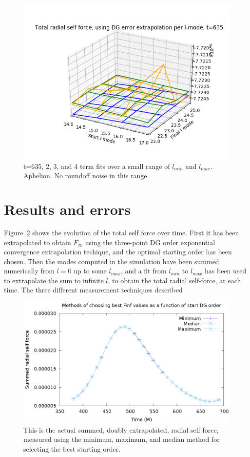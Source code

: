 \begin{figure}
  \includegraphics{bestfinflminlmax234termst635smallrange_perihelion}
  \caption{t=635, 2, 3, and 4 term fits over a small range of $l_{min}$ and $l_{max}$. Aphelion. No roundoff noise in this range.}
  \label{surface234small}
\end{figure}



\section{Results and errors}

Figure~\ref{totalselfforcevt} shows the evolution of the total self force over time. First it has been extrapolated to obtain $F_\infty$ using the three-point DG order exponential convergence extrapolation techique, and the optimal starting order has been chosen. Then the modes computed in the simulation have been summed numerically from $l=0$ up to some $l_{max}$, and a fit from $l_{min}$ to $l_{max}$ has been used to extrapolate the sum to infinite $l$, to obtain the total radial self-force, at each time. The three different measurement techniques described 


\begin{figure}
  \includegraphics{bestfinfscriptplot.eps}
  \caption{This is the actual summed, doubly extrapolated, radial self force, measured using the minimum, maximum, and median method for selecting the best starting order.}
\label{totalselfforcevt}
\end{figure}


